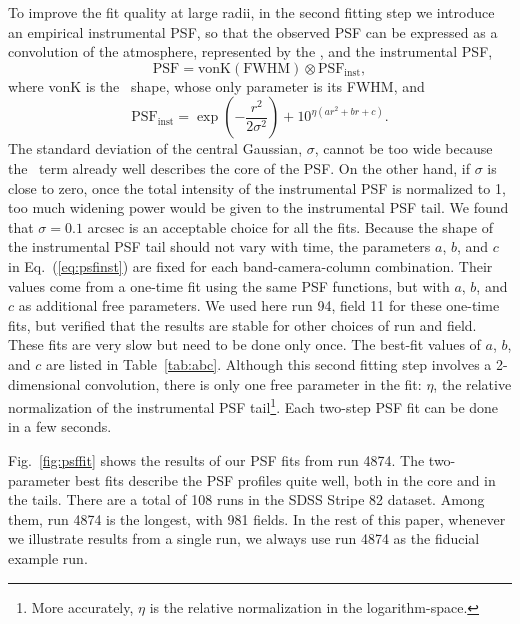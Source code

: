 To improve the fit quality at large radii, in the second fitting step we introduce an
empirical instrumental PSF, so that the observed PSF can be expressed as
a convolution of the atmosphere, represented by the \vk, and
the instrumental PSF,
\begin{equation}
        \textrm{PSF} = \textrm{vonK} (\textrm{FWHM}) \otimes \textrm{PSF}_{\textrm{inst}},
\end{equation} 
where vonK is the \vk~shape, whose only parameter is its FWHM, and
\begin{equation}
        \textrm{PSF}_{\textrm{inst}} = \exp(-\frac{r^2}{2\sigma^2}) + 10^{\eta(ar^2+br+c)}.
\label{eq:psfinst}
\end{equation} 
The standard deviation of the central Gaussian, $\sigma$, cannot be
too wide because the \vk~term already well describes the core of the PSF.
On the other hand, if $\sigma$ is close to zero, once the
total intensity of the instrumental PSF is normalized to 1, too much
widening power would be given to the instrumental PSF tail.
We found that $\sigma = 0.1$ arcsec is an acceptable choice for all the fits.
Because the shape of the instrumental PSF tail should not vary with
time, the parameters $a$, $b$, and $c$ in Eq.~(\ref{eq:psfinst}) are
fixed for each band-camera-column combination.
Their values come from a one-time fit using the same PSF functions,
but with $a$, $b$, and $c$ as additional free parameters.
We used here run 94, field 11 for these one-time fits, but verified that 
the results are stable for other choices of run and field. 
These fits are very slow but need to be done only once.
The best-fit values of $a$, $b$, and $c$ are listed in Table~\ref{tab:abc}.
Although this second fitting step involves a 2-dimensional convolution,
there is only one free parameter in the fit: $\eta$, the relative normalization of the
instrumental PSF tail\footnote{More accurately, $\eta$ is the relative
normalization in the logarithm-space.}. Each two-step PSF fit can be done in a few seconds.

Fig.~\ref{fig:psffit} shows the results of our PSF fits from run 4874. The two-parameter
best fits describe the PSF profiles quite well, both in the core and in the tails. There are 
a total of 108 runs in the SDSS Stripe 82 dataset. Among them, run 4874 is the longest, 
with 981 fields. In the rest of this paper, whenever we illustrate results from a single run, 
we always use run 4874 as the fiducial example run. 


